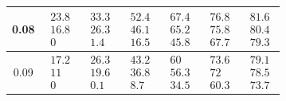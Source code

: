 \documentclass{article}
\begin{document}
\begin{table}[htbp]
\begin{tabular}{ccccccc}
0.08 &
$\begin{matrix}23.8\\16.8\\0\end{matrix}$ &
$\begin{matrix}33.3\\26.3\\1.4\end{matrix}$ &
$\begin{matrix}52.4\\46.1\\16.5\end{matrix}$ &
$\begin{matrix}67.4\\65.2\\45.8\end{matrix}$ &
$\begin{matrix}76.8\\75.8\\67.7\end{matrix}$ &
$\begin{matrix}81.6\\80.4\\79.3\end{matrix}$
\\[3pt]\hline

0.09 &
$\begin{matrix}17.2\\11\\0\end{matrix}$ &
$\begin{matrix}26.3\\19.6\\0.1\end{matrix}$ &
$\begin{matrix}43.2\\36.8\\8.7\end{matrix}$ &
$\begin{matrix}60\\56.3\\34.5\end{matrix}$ &
$\begin{matrix}73.6\\72\\60.3\end{matrix}$ &
$\begin{matrix}79.1\\78.5\\73.7\end{matrix}$
\\[3pt]\hline


\end{tabular}
\end{table}
\end{document}
